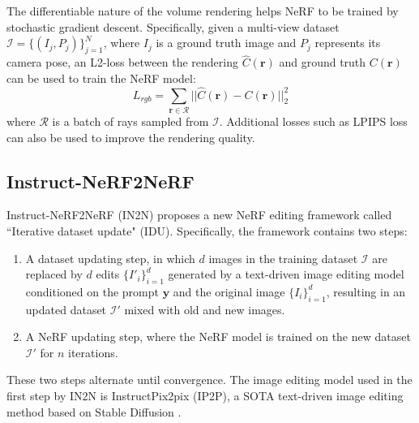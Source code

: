 The differentiable nature of the volume rendering helps NeRF to be trained by stochastic gradient descent. Specifically, given a multi-view dataset $\mathcal{I} = \{(I_j, P_j)\}_{j=1}^{N}$, where $I_j$ is a ground truth image and $P_j$ represents its camera pose, an L2-loss between the rendering $\hat{C}(\mathbf{r})$ and ground truth $C(\mathbf{r})$ can be used to train the NeRF model:
\begin{equation}
    L_{rgb} = \sum_{\mathbf{r} \in \mathcal{R}}||\hat{C}(\mathbf{r}) - C(\mathbf{r})||^2_2
    \label{equ: nerf loss}
\end{equation}
where $\mathcal{R}$ is a batch of rays sampled from $\mathcal{I}$. Additional losses such as LPIPS loss \cite{8578166} can also be used to improve the rendering quality.

\subsection{Instruct-NeRF2NeRF}
\label{sec: Instruct-NeRF2NeRF}
Instruct-NeRF2NeRF \cite{haque2023instruct} (IN2N) proposes a new NeRF editing framework called ``Iterative dataset update" (IDU). Specifically, the framework contains two steps:
\begin{enumerate}
    \item A dataset updating step,
    in which $d$ images in the training dataset $\mathcal{I}$ are replaced by $d$ edits $\{I'_i\}_{i=1}^{d}$ generated by a text-driven image editing model conditioned on the prompt $\mathbf{y}$ and the original image $\{I_i\}_{i=1}^{d}$, resulting in an updated dataset $\mathcal{I}'$ mixed with old and new images.
    \item A NeRF updating step, where the NeRF model is trained on the new dataset $\mathcal{I}'$ for $n$ iterations.
\end{enumerate}
These two steps alternate until convergence. The image editing model used in the first step by IN2N is InstructPix2pix \cite{brooks2023instructpix2pix} (IP2P), a SOTA text-driven image editing method based on Stable Diffusion \cite{rombach2022high}.

